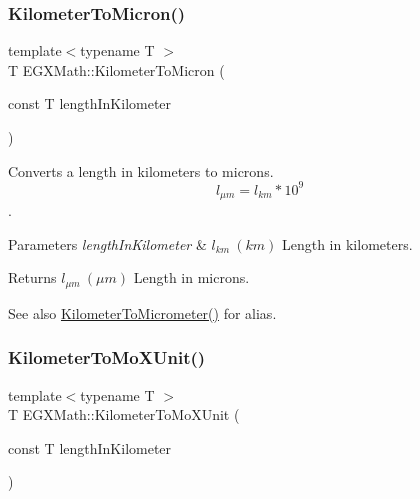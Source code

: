 \subsubsection{\texorpdfstring{Kilometer\+To\+Micron()}{KilometerToMicron()}}
{\footnotesize\ttfamily template$<$typename T $>$ \\
T E\+G\+X\+Math\+::\+Kilometer\+To\+Micron (\begin{DoxyParamCaption}\item[{const T}]{length\+In\+Kilometer }\end{DoxyParamCaption})}



Converts a length in kilometers to microns. \[ l_{\mu m}=l_{km} * 10^{9} \]. 


\begin{DoxyParams}{Parameters}
{\em length\+In\+Kilometer} & $ l_{km}\ (km)$ Length in kilometers. \\
\hline
\end{DoxyParams}
\begin{DoxyReturn}{Returns}
$ l_{\mu m}\ (\mu m)$ Length in microns. 
\end{DoxyReturn}
\begin{DoxySeeAlso}{See also}
\mbox{\hyperlink{group___e_g_x_math-_conversions-_length_conversions-_s_i-_kilometer-_s_i_ga345d16c72fcb96ff1dc3b7f290b94c94}{Kilometer\+To\+Micrometer()}} for alias. 
\end{DoxySeeAlso}
\mbox{\label{group___e_g_x_math-_conversions-_length_conversions-_s_i-_kilometer-_non-_s_i_ga547782594ebd0cc3e565f6d32f9528df}} 
\subsubsection{\texorpdfstring{Kilometer\+To\+Mo\+X\+Unit()}{KilometerToMoXUnit()}}
{\footnotesize\ttfamily template$<$typename T $>$ \\
T E\+G\+X\+Math\+::\+Kilometer\+To\+Mo\+X\+Unit (\begin{DoxyParamCaption}\item[{const T}]{length\+In\+Kilometer }\end{DoxyParamCaption})}



